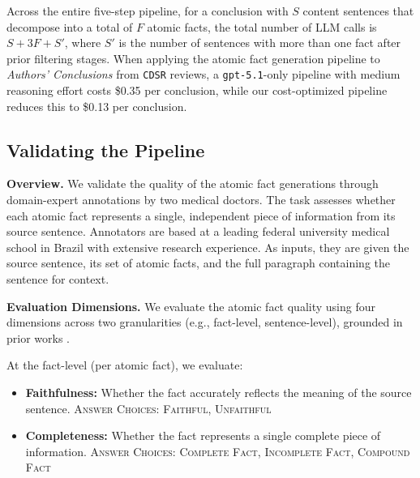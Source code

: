 \documentclass{article}
\newcommand{\xhdr}[1]{%
  \noindent\textbf{#1.}
}
\begin{document}
Across the entire five-step pipeline, for a conclusion with $S$ content sentences that decompose into a total of $F$ atomic facts, the total number of LLM calls is $S + 3F + S'$, where $S'$ is the number of sentences with more than one fact after prior filtering stages. When applying the atomic fact generation pipeline to \textit{Authors’ Conclusions} from \texttt{CDSR} reviews, a \texttt{gpt-5.1}-only pipeline with medium reasoning effort costs \$0.35 per conclusion, while our cost-optimized pipeline reduces this to \$0.13 per conclusion.

\subsection{Validating the Pipeline}\label{appendix:afg-validation}


\xhdr{Overview} We validate the quality of the atomic fact generations through domain-expert annotations by two medical doctors. The task assesses whether each atomic fact represents a single, independent piece of information from its source sentence. Annotators are based at a leading federal university medical school in Brazil with extensive research experience. As inputs, they are given the source sentence, its set of atomic facts, and the full paragraph containing the sentence for context.

\xhdr{Evaluation Dimensions} We evaluate the atomic fact quality using four dimensions across two granularities (e.g., fact-level, sentence-level), grounded in prior works \cite{kaur2025whosaskingsimulatingrolebased, liu-etal-2025-verifact, mir-etal-2019-evaluating, park-etal-2024-valuescope}. 

At the fact-level (per atomic fact), we evaluate:
\begin{itemize}[leftmargin=0.6cm]
    \item \textbf{Faithfulness:} Whether the fact accurately reflects the meaning of the source sentence. \textsc{Answer Choices: Faithful, Unfaithful}
    \item \textbf{Completeness:} Whether the fact represents a single complete piece of information. \textsc{Answer Choices: Complete Fact, Incomplete Fact, Compound Fact}
\end{itemize}
\end{document}

